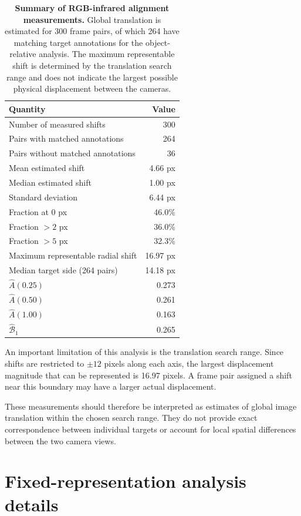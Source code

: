\documentclass[10pt]{article}
\begin{document}
\begin{table}[h]
\centering
\caption{\textbf{Summary of RGB-infrared alignment measurements.}
Global translation is estimated for 300 frame pairs, of which 264 have matching target annotations for the object-relative analysis. The maximum representable shift is determined by the translation search range and does not indicate the largest possible physical displacement between the cameras.}
\label{tab:alignsummary}
\small
\begin{tabular}{lr}
\toprule
Quantity & Value \\
\midrule
Number of measured shifts & 300 \\
Pairs with matched annotations & 264 \\
Pairs without matched annotations & 36 \\
Mean estimated shift & 4.66 px \\
Median estimated shift & 1.00 px \\
Standard deviation & 6.44 px \\
Fraction at 0 px & 46.0\% \\
Fraction $>2$ px & 36.0\% \\
Fraction $>5$ px & 32.3\% \\
Maximum representable radial shift & 16.97 px \\
Median target side (264 pairs) & 14.18 px \\
$\widehat A(0.25)$ & 0.273 \\
$\widehat A(0.50)$ & 0.261 \\
$\widehat A(1.00)$ & 0.163 \\
$\widehat{\mathcal B}_{1}$ & 0.265 \\
\bottomrule
\end{tabular}
\end{table}

An important limitation of this analysis is the translation search range. Since shifts are restricted to $\pm12$ pixels along each axis, the largest displacement magnitude that can be represented is 16.97 pixels. A frame pair assigned a shift near this boundary may have a larger actual displacement.

These measurements should therefore be interpreted as estimates of global image translation within the chosen search range. They do not provide exact correspondence between individual targets or account for local spatial differences between the two camera views.


\section{Fixed-representation analysis details}
\label{app:intrinsic}
\end{document}
